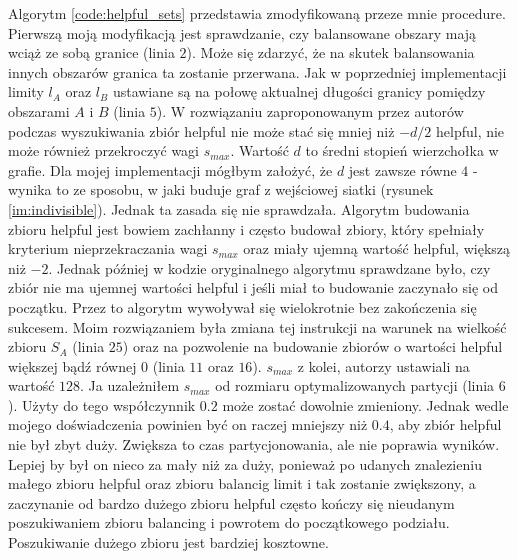 Algorytm \ref{code:helpful_sets} przedstawia zmodyfikowaną przeze mnie procedure.
Pierwszą moją modyfikacją jest sprawdzanie, czy balansowane obszary mają wciąż ze sobą granice (linia $2$).
Może się zdarzyć, że na skutek balansowania innych obszarów granica ta zostanie przerwana.
Jak w poprzedniej implementacji limity $l_A$ oraz $l_B$ ustawiane są na połowę aktualnej długości granicy pomiędzy
obszarami $A$ i $B$ (linia $5$).
W rozwiązaniu zaproponowanym przez autorów \cite{1364754} podczas wyszukiwania zbiór helpful nie może stać się mniej
niż $-d/2$ helpful, nie może również przekroczyć wagi $s_{max}$.
Wartość $d$ to średni stopień wierzchołka w grafie.
Dla mojej implementacji mógłbym założyć, że $d$ jest zawsze równe $4$ - wynika to ze sposobu, w jaki buduje
graf z wejściowej siatki (rysunek \ref{im:indivisible}).
Jednak ta zasada się nie sprawdzała.
Algorytm budowania zbioru helpful jest bowiem zachłanny i często budował zbiory, który spełniały kryterium nieprzekraczania
wagi $s_{max}$ oraz miały ujemną wartość helpful, większą niż $-2$.
Jednak później w kodzie oryginalnego algorytmu sprawdzane było, czy zbiór nie ma ujemnej wartości helpful i
jeśli miał to budowanie zaczynało się od początku.
Przez to algorytm wywoływał się wielokrotnie bez zakończenia się sukcesem.
Moim rozwiązaniem była zmiana tej instrukcji na warunek na wielkość zbioru $S_A$ (linia $25$) oraz na
pozwolenie na budowanie zbiorów o wartości helpful większej bądź równej $0$ (linia $11$ oraz $16$).
$s_{max}$ z kolei, autorzy \cite{article} ustawiali na wartość $128$.
Ja uzależniłem $s_{max}$ od rozmiaru optymalizowanych partycji (linia $6$).
Użyty do tego współczynnik $0.2$ może zostać dowolnie zmieniony.
Jednak wedle mojego doświadczenia powinien być on raczej mniejszy niż $0.4$, aby zbiór helpful nie był zbyt duży.
Zwiększa to czas partycjonowania, ale nie poprawia wyników.
Lepiej by był on nieco za mały niż za duży, ponieważ po udanych znalezieniu małego zbioru helpful oraz zbioru balancig
limit i tak zostanie zwiększony, a zaczynanie od bardzo dużego zbioru helpful często kończy się nieudanym poszukiwaniem
zbioru balancing i powrotem do początkowego podziału.
Poszukiwanie dużego zbioru jest bardziej kosztowne.


